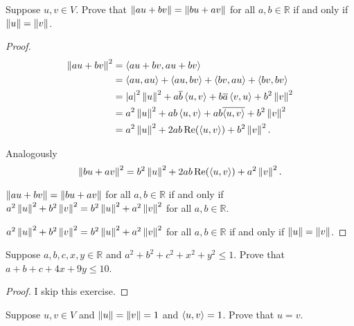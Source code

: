 \begin{exercise}
    Suppose $u, v\in V$. Prove that $\left\Vert{au + bv}\right\Vert = \left\Vert{bu + av}\right\Vert$ for all $a, b\in\mathbb{R}$ if and only if $\left\Vert{u}\right\Vert = \left\Vert{v}\right\Vert$.
\end{exercise}

\begin{proof}
    \begin{align*}
        \left\Vert{au + bv}\right\Vert^{2} & = \left\langle{au + bv, au + bv}\right\rangle                                                                        \\
                           & = \left\langle{au, au}\right\rangle + \left\langle{au, bv}\right\rangle + \left\langle{bv, au}\right\rangle + \left\langle{bv, bv}\right\rangle                   \\
                           & = \left\vert{a}\right\vert^{2}\left\Vert{u}\right\Vert^{2} + a\overline{b}\left\langle{u, v}\right\rangle + b\overline{a}\left\langle{v, u}\right\rangle + b^{2}\left\Vert{v}\right\Vert^{2} \\
                           & = a^{2}\left\Vert{u}\right\Vert^{2} + ab\left\langle{u, v}\right\rangle + ab\overline{\left\langle{u, v}\right\rangle} + b^{2}\left\Vert{v}\right\Vert^{2}              \\
                           & = a^{2}\left\Vert{u}\right\Vert^{2} + 2ab \operatorname{Re}(\left\langle{u, v}\right\rangle) + b^{2}\left\Vert{v}\right\Vert^{2}.
    \end{align*}

    Analogously
    \[
        \left\Vert{bu + av}\right\Vert^{2} = b^{2}\left\Vert{u}\right\Vert^{2} + 2ab \operatorname{Re}(\left\langle{u, v}\right\rangle) + a^{2}\left\Vert{v}\right\Vert^{2}.
    \]

    $\left\Vert{au + bv}\right\Vert = \left\Vert{bu + av}\right\Vert$ for all $a, b\in\mathbb{R}$ if and only if $a^{2}\left\Vert{u}\right\Vert^{2} + b^{2}\left\Vert{v}\right\Vert^{2} = b^{2}\left\Vert{u}\right\Vert^{2} + a^{2}\left\Vert{v}\right\Vert^{2}$ for all $a, b\in\mathbb{R}$.

    $a^{2}\left\Vert{u}\right\Vert^{2} + b^{2}\left\Vert{v}\right\Vert^{2} = b^{2}\left\Vert{u}\right\Vert^{2} + a^{2}\left\Vert{v}\right\Vert^{2}$ for all $a, b\in\mathbb{R}$ if and only if $\left\Vert{u}\right\Vert = \left\Vert{v}\right\Vert$.
\end{proof}
\newpage

\begin{exercise}
    Suppose $a, b, c, x, y \in \mathbb{R}$ and $a^{2} + b^{2} + c^{2} + x^{2} + y^{2} \leq 1$. Prove that $a + b + c + 4x + 9y \leq 10$.
\end{exercise}

\begin{proof}
    I skip this exercise.
\end{proof}
\newpage

\begin{exercise}
    Suppose $u, v \in V$ and $\left\Vert{u}\right\Vert = \left\Vert{v}\right\Vert = 1$ and $\left\langle{u, v}\right\rangle = 1$. Prove that $u = v$.
\end{exercise}

